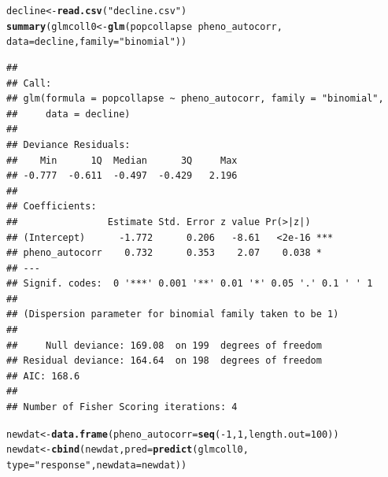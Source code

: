 \documentclass[12pt,a4paper]{scrartcl}\usepackage[]{graphicx}\usepackage[]{color}
\makeatletter
\newcommand{\hlnum}[1]{\textcolor[rgb]{0.686,0.059,0.569}{#1}}%
\newcommand{\hlstr}[1]{\textcolor[rgb]{0.192,0.494,0.8}{#1}}%
\newcommand{\hlopt}[1]{\textcolor[rgb]{0,0,0}{#1}}%
\newcommand{\hlstd}[1]{\textcolor[rgb]{0.345,0.345,0.345}{#1}}%
\newcommand{\hlkwb}[1]{\textcolor[rgb]{0.69,0.353,0.396}{#1}}%
\newcommand{\hlkwc}[1]{\textcolor[rgb]{0.333,0.667,0.333}{#1}}%
\newcommand{\hlkwd}[1]{\textcolor[rgb]{0.737,0.353,0.396}{\textbf{#1}}}%
\newenvironment{kframe}{%
 \def\at@end@of@kframe{}%
 \ifinner\ifhmode%
  \def\at@end@of@kframe{\end{minipage}}%
  \begin{minipage}{\columnwidth}%
 \fi\fi%
 \def\FrameCommand##1{\hskip\@totalleftmargin \hskip-\fboxsep
 \colorbox{shadecolor}{##1}\hskip-\fboxsep
     \hskip-\linewidth \hskip-\@totalleftmargin \hskip\columnwidth}%
 \MakeFramed {\advance\hsize-\width
   \@totalleftmargin\z@ \linewidth\hsize
   \@setminipage}}%
 {\par\unskip\endMakeFramed%
 \at@end@of@kframe}
\newenvironment{knitrout}{}{} %
\makeatother
\begin{document}
\begin{Answer}
\begin{knitrout}
\color{fgcolor}\begin{kframe}
\begin{alltt}
\hlstd{decline} \hlkwb{<-} \hlkwd{read.csv}\hlstd{(}\hlstr{"decline.csv"}\hlstd{)}
\hlkwd{summary}\hlstd{(glmcoll0} \hlkwb{<-} \hlkwd{glm}\hlstd{(popcollapse}\hlopt{~}\hlstd{pheno_autocorr,}
                      \hlkwc{data} \hlstd{= decline,} \hlkwc{family} \hlstd{=} \hlstr{"binomial"}\hlstd{))}
\end{alltt}
\begin{verbatim}
## 
## Call:
## glm(formula = popcollapse ~ pheno_autocorr, family = "binomial", 
##     data = decline)
## 
## Deviance Residuals: 
##    Min      1Q  Median      3Q     Max  
## -0.777  -0.611  -0.497  -0.429   2.196  
## 
## Coefficients:
##                Estimate Std. Error z value Pr(>|z|)    
## (Intercept)      -1.772      0.206   -8.61   <2e-16 ***
## pheno_autocorr    0.732      0.353    2.07    0.038 *  
## ---
## Signif. codes:  0 '***' 0.001 '**' 0.01 '*' 0.05 '.' 0.1 ' ' 1
## 
## (Dispersion parameter for binomial family taken to be 1)
## 
##     Null deviance: 169.08  on 199  degrees of freedom
## Residual deviance: 164.64  on 198  degrees of freedom
## AIC: 168.6
## 
## Number of Fisher Scoring iterations: 4
\end{verbatim}
\begin{alltt}
\hlstd{newdat} \hlkwb{<-} \hlkwd{data.frame}\hlstd{(}\hlkwc{pheno_autocorr}\hlstd{=}\hlkwd{seq}\hlstd{(}\hlopt{-}\hlnum{1}\hlstd{,}\hlnum{1}\hlstd{,}\hlkwc{length.out} \hlstd{=} \hlnum{100}\hlstd{))}
\hlstd{newdat} \hlkwb{<-} \hlkwd{cbind}\hlstd{(newdat,} \hlkwc{pred} \hlstd{=} \hlkwd{predict}\hlstd{(glmcoll0,}
                          \hlkwc{type} \hlstd{=} \hlstr{"response"}\hlstd{,} \hlkwc{newdata} \hlstd{= newdat))}


\end{alltt}
\end{kframe}
\end{knitrout}
\end{Answer}
\end{document}

